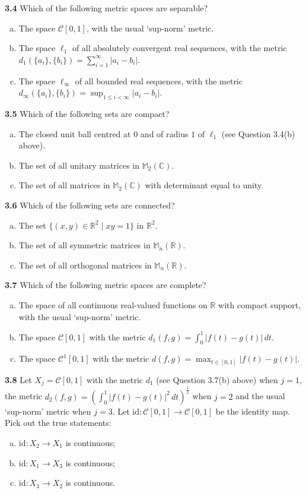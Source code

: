 \documentclass[11pt,a4paper]{article}
\newcommand{\R}{\mathbb{R}}
\newcommand{\C}{\mathbb{C}}
\newcommand{\M}{\mathbb{M}}
\newcommand{\qitem}[1]{\par\medskip\noindent\textbf{#1}\hspace{0.5em}}
\begin{document}
\qitem{3.4} Which of the following metric spaces are separable?
\begin{enumerate}[a.]
  \item The space $\mathcal{C}[0, 1]$, with the usual `sup-norm' metric.
  \item The space $\ell_1$ of all absolutely convergent real sequences, with the metric $d_1(\{a_i\}, \{b_i\}) = \sum_{i=1}^{\infty} |a_i - b_i|$.
  \item The space $\ell_\infty$ of all bounded real sequences, with the metric $d_\infty(\{a_i\}, \{b_i\}) = \sup_{1 \le i < \infty} |a_i - b_i|$.
\end{enumerate}

\qitem{3.5} Which of the following sets are compact?
\begin{enumerate}[a.]
  \item The closed unit ball centred at $0$ and of radius $1$ of $\ell_1$ (see Question 3.4(b) above).
  \item The set of all unitary matrices in $\M_2(\C)$.
  \item The set of all matrices in $\M_2(\C)$ with determinant equal to unity.
\end{enumerate}

\qitem{3.6} Which of the following sets are connected?
\begin{enumerate}[a.]
  \item The set $\{(x, y) \in \R^2 \mid xy = 1\}$ in $\R^2$.
  \item The set of all symmetric matrices in $\M_n(\R)$.
  \item The set of all orthogonal matrices in $\M_n(\R)$.
\end{enumerate}

\qitem{3.7} Which of the following metric spaces are complete?
\begin{enumerate}[a.]
  \item The space of all continuous real-valued functions on $\R$ with compact support, with the usual `sup-norm' metric.
  \item The space $\mathcal{C}[0, 1]$ with the metric $d_1(f, g) = \int_0^1 |f(t) - g(t)|\,dt$.
  \item The space $\mathcal{C}^1[0, 1]$ with the metric $d(f, g) = \max_{t \in [0, 1]} |f(t) - g(t)|$.
\end{enumerate}

\qitem{3.8} Let $X_j = \mathcal{C}[0, 1]$ with the metric $d_1$ (see Question 3.7(b) above) when $j = 1$, the metric $d_2(f, g) = \left(\int_0^1 |f(t) - g(t)|^2\,dt\right)^{\frac{1}{2}}$ when $j = 2$ and the usual `sup-norm' metric when $j = 3$. Let $\mathrm{id} : \mathcal{C}[0, 1] \to \mathcal{C}[0, 1]$ be the identity map. Pick out the true statements:
\begin{enumerate}[a.]
  \item $\mathrm{id} : X_2 \to X_1$ is continuous;
  \item $\mathrm{id} : X_1 \to X_3$ is continuous;
  \item $\mathrm{id} : X_3 \to X_2$ is continuous.
\end{enumerate}
\end{document}
